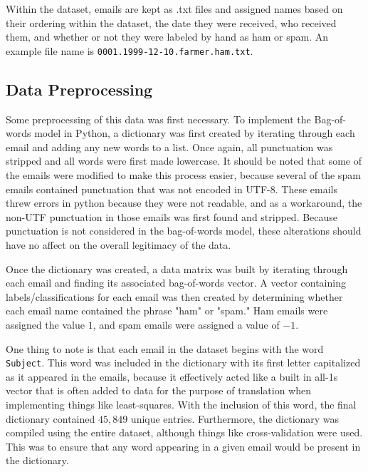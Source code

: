 \documentclass{article}
\begin{document}
Within the dataset, emails are kept as .txt files and assigned names based on their ordering within the dataset, the date they were received, who received them, and whether or not they were labeled by hand as ham or spam. An example file name is \texttt{0001.1999-12-10.farmer.ham.txt}.


\subsection{Data Preprocessing}
Some preprocessing of this data was first necessary. To implement the Bag-of-words model in Python, a dictionary was first created by iterating through each email and adding any new words to a list. Once again, all punctuation was stripped and all words were first made lowercase. It should be noted that some of the emails were modified to make this process easier, because several of the spam emails contained punctuation that was not encoded in UTF-8. These emails threw errors in python because they were not readable, and as a workaround, the non-UTF punctuation in those emails was first found and stripped. Because punctuation is not considered in the bag-of-words model, these alterations should have no affect on the overall legitimacy of the data.

Once the dictionary was created, a data matrix was built by iterating through each email and finding its associated bag-of-words vector. A vector containing labels/classifications for each email was then created by determining whether each email name contained the phrase "ham" or "spam." Ham emails were assigned the value $1$, and spam emails were assigned a value of $-1$.

One thing to note is that each email in the dataset begins with the word \texttt{Subject}. This word was included in the dictionary with its first letter capitalized as it appeared in the emails, because it effectively acted like a built in all-1s vector that is often added to data for the purpose of translation when implementing things like least-squares. With the inclusion of this word, the final dictionary contained $45,849$ unique entries. Furthermore, the dictionary was compiled using the entire dataset, although things like cross-validation were used. This was to ensure that any word appearing in a given email would be present in the dictionary. 
\end{document}
